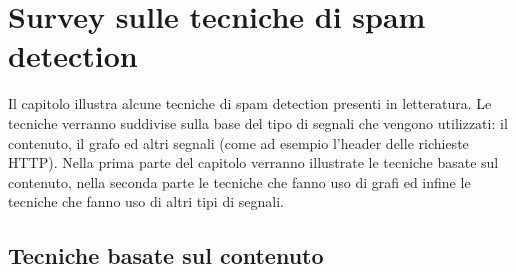 \chapter{Survey sulle tecniche di spam detection}

Il capitolo illustra alcune tecniche di spam detection presenti in letteratura. Le tecniche verranno suddivise sulla base del tipo di segnali che vengono utilizzati: il contenuto, il grafo ed altri segnali (come ad esempio l'header delle richieste HTTP). Nella prima parte del capitolo verranno illustrate le tecniche basate sul contenuto, nella seconda parte le tecniche che fanno uso di grafi ed infine le tecniche che fanno uso di altri tipi di segnali.

\section{Tecniche basate sul contenuto}
